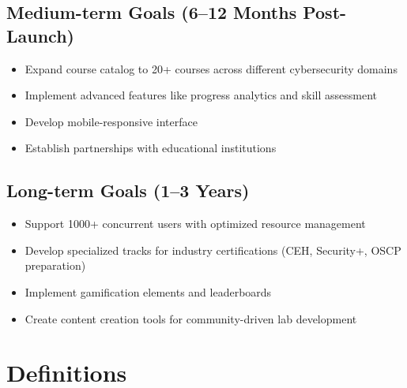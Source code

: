 \documentclass[12pt,a4paper]{report}
\begin{document}
\subsection{Medium-term Goals (6--12 Months Post-Launch)}
\begin{itemize}
  \item Expand course catalog to 20+ courses across different cybersecurity domains
  \item Implement advanced features like progress analytics and skill assessment
  \item Develop mobile-responsive interface
  \item Establish partnerships with educational institutions
\end{itemize}

\subsection{Long-term Goals (1--3 Years)}
\begin{itemize}
  \item Support 1000+ concurrent users with optimized resource management
  \item Develop specialized tracks for industry certifications (CEH, Security+, OSCP preparation)
  \item Implement gamification elements and leaderboards
  \item Create content creation tools for community-driven lab development
\end{itemize}

\section{Definitions}
\end{document}
